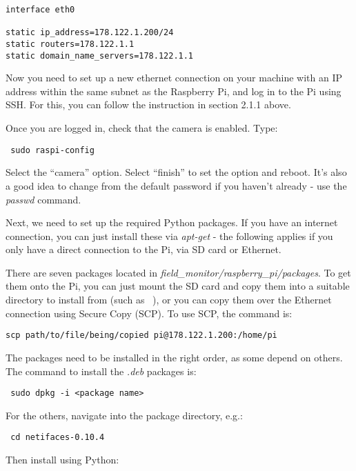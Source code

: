 \documentclass[10pt]{article}
\begin{document}
\begin{verbatim}
interface eth0

static ip_address=178.122.1.200/24
static routers=178.122.1.1
static domain_name_servers=178.122.1.1
\end{verbatim}

Now you need to set up a new ethernet connection on your machine with an IP address within the same subnet as the Raspberry Pi, and log in to the Pi using SSH. For this, you can follow the instruction in section 2.1.1 above.

Once you are logged in, check that the camera is enabled. Type:

\begin{verbatim}
 sudo raspi-config
\end{verbatim}

Select the ``camera'' option. Select ``finish'' to set the option and reboot. It's also a good idea to change from the default password if you haven't already - 
use the \textit{passwd} command. 

Next, we need to set up the required Python packages. If you have an internet connection, you can just install these via \textit{apt-get} - the following applies if 
you only have a direct connection to the Pi, via SD card or Ethernet.

There are seven packages located in \textit{field\_monitor/raspberry\_pi/packages}. To get them onto the Pi, you can just mount the SD card
and copy them into a suitable directory to install from (such as ~), or you can copy them over the Ethernet connection using Secure Copy (SCP). To use SCP, the 
command is:

\begin{verbatim}
scp path/to/file/being/copied pi@178.122.1.200:/home/pi
\end{verbatim}

The packages need to be installed in the right order, as some depend on others. The command to install the \textit{.deb} packages is:

\begin{verbatim}
 sudo dpkg -i <package name>
\end{verbatim}

For the others, navigate into the package directory, e.g.:

\begin{verbatim}
 cd netifaces-0.10.4
\end{verbatim}

Then install using Python:
\end{document}
